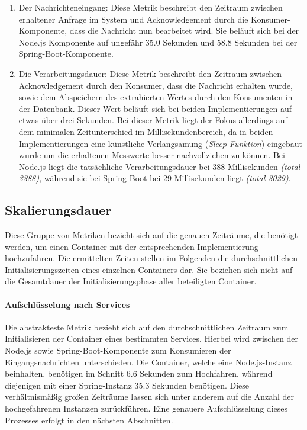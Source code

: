 \begin{enumerate}
  \item Der Nachrichteneingang: Diese Metrik beschreibt den Zeitraum zwischen erhaltener Anfrage im System und Acknowledgement durch die Konsumer-Komponente, dass die Nachricht nun bearbeitet wird. Sie beläuft sich bei der Node.js Komponente auf ungefähr 35.0 Sekunden und 58.8 Sekunden bei der Spring-Boot-Komponente. 
  \item Die Verarbeitungsdauer: Diese Metrik beschreibt den Zeitraum zwischen Acknowledgement durch den Konsumer, dass die Nachricht erhalten wurde, sowie dem Abspeichern des extrahierten Wertes durch den Konsumenten in der Datenbank. Dieser Wert beläuft sich bei beiden Implementierungen auf etwas über drei Sekunden. Bei dieser Metrik liegt der Fokus allerdings auf dem minimalen Zeitunterschied im Millisekundenbereich, da in beiden Implementierungen eine künstliche Verlangsamung (\emph{Sleep-Funktion}) eingebaut wurde um die erhaltenen Messwerte besser nachvollziehen zu können. Bei Node.js liegt die tatsächliche Verarbeitungsdauer bei 388 Millisekunden \emph{(total 3388)}, während sie bei Spring Boot bei 29 Millisekunden liegt \emph{(total 3029)}.
\end{enumerate}

\subsection{Skalierungsdauer}
Diese Gruppe von Metriken bezieht sich auf die genauen Zeiträume, die benötigt werden, um einen Container mit der entsprechenden Implementierung hochzufahren. Die ermittelten Zeiten stellen im Folgenden die durchschnittlichen Initialisierungszeiten eines einzelnen Containers dar. Sie beziehen sich nicht auf die Gesamtdauer der Initialisierungsphase aller beteiligten Container.


\paragraph{Aufschlüsselung nach Services}
Die abstrakteste Metrik bezieht sich auf den durchschnittlichen Zeitraum zum Initialisieren der Container eines bestimmten Services. Hierbei wird zwischen der Node.js sowie Spring-Boot-Komponente zum Konsumieren der Eingangsnachrichten unterschieden. Die Container, welche eine Node.js-Instanz beinhalten, benötigen im Schnitt 6.6 Sekunden zum Hochfahren, während diejenigen mit einer Spring-Instanz 35.3 Sekunden benötigen. Diese verhältnismäßig großen Zeiträume lassen sich unter anderem auf die Anzahl der hochgefahrenen Instanzen zurückführen. Eine genauere Aufschlüsselung dieses Prozesses erfolgt in den nächsten Abschnitten.

